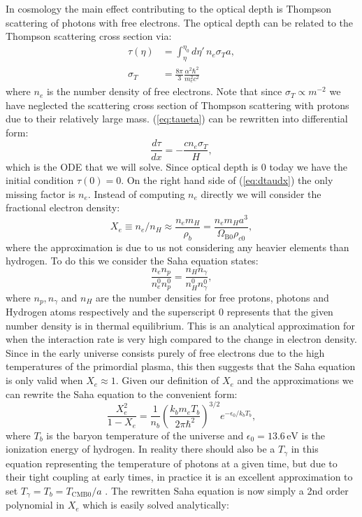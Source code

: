 \documentclass[%
reprint,
 amsmath,amssymb,
 aps,
]{revtex4-2}
\begin{document}
In cosmology the main effect contributing to the optical depth is Thompson scattering of photons with free electrons. The optical depth can be related to the Thompson scattering cross section via:
\begin{align}
	\tau(\eta)&=\int_\eta^{\eta_0}d\eta'\,n_e\sigma_Ta,
	\label{eq:taueta}\\
	\sigma_T&=\frac{8\pi}{3}\frac{\alpha^2\hbar^2}{m_e^2c^2}\nonumber
\end{align}
where $n_e$ is the number density of free electrons. Note that since $\sigma_T\propto m^{-2}$ we have neglected the scattering cross section of Thompson scattering with protons due to their relatively large mass. (\ref{eq:taueta}) can be rewritten into differential form:
\begin{equation}
	\frac{d\tau}{dx}=-\frac{cn_e\sigma_T}{H}, \label{eq:dtaudx}
\end{equation}
which is the ODE that we will solve. Since optical depth is $0$ today we have the initial condition $\tau(0)=0$. On the right hand side of (\ref{eq:dtaudx}) the only missing factor is $n_e$. Instead of computing $n_e$ directly we will consider the fractional electron density:
\[X_e\equiv n_e/n_H\approx\frac{n_em_H}{\rho_b}=\frac{n_em_Ha^3}{\Omega_{\text{B}0}\rho_{c0}},\]
where the approximation is due to us not considering any heavier elements than hydrogen. To do this we consider the Saha equation states:
\[\frac{n_en_p}{n_e^{0}n_p^{0}}=\frac{n_Hn_\gamma}{n_H^{0}n_\gamma^{0}},\]
where $n_p,n_\gamma$ and $n_H$ are the number densities for free protons, photons and Hydrogen atoms respectively and the superscript $0$ represents that the given number density is in thermal equilibrium. This is an analytical approximation for when the interaction rate is very high compared to the change in electron density. Since in the early universe consists purely of free electrons due to the high temperatures of the primordial plasma, this then suggests that the Saha equation is only valid when $X_e\approx 1$. Given our definition of $X_e$ and the approximations we can rewrite the Saha equation to the convenient form:
\begin{equation}
	\frac{X_e^2}{1-X_e}=\frac{1}{n_b}\left(\frac{k_bm_eT_b}{2\pi\hbar^2}\right)^{3/2}e^{-\epsilon_0/k_bT_b},
\end{equation}
where $T_b$ is the baryon temperature of the universe and $\epsilon_0=13.6\,\text{eV}$ is the ionization energy of hydrogen. In reality there should also be a $T_\gamma$ in this equation representing the temperature of photons at a given time, but due to their tight coupling at early times, in practice it is an excellent approximation to set $T_\gamma=T_b=T_{\text{CMB}0}/a$ \cite{AST5220LectureNotes}. The rewritten Saha equation is now simply a 2nd order polynomial in $X_e$ which is easily solved analytically:
\end{document}
